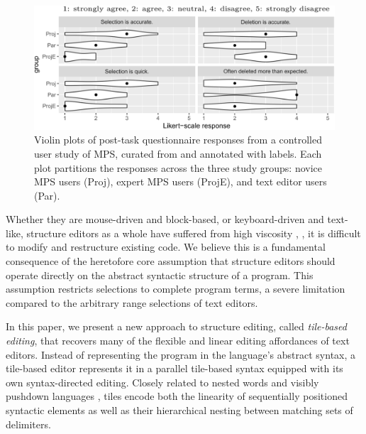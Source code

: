 \begin{figure}[b]
  \centering
  \includegraphics[width=\columnwidth]{img/mps-violin-plots.png}
  \caption{Violin plots of post-task questionnaire responses
  from a controlled user study of MPS, curated from \cite{ProjEfficiency}
  and annotated with labels.
  Each plot partitions the responses across the three study groups:
  novice MPS users (Proj), expert MPS users (ProjE),
  and text editor users (Par).
  }
  \label{fig:mps-violin-plots}
\end{figure}

Whether they are mouse-driven and block-based,
or keyboard-driven and text-like,
structure editors as a whole have suffered
from high viscosity \cite{cog-dim},
\ie, it is difficult to modify
and restructure existing code.
We believe this is a fundamental consequence
of the heretofore core assumption that structure editors
should operate directly on the abstract syntactic structure
of a program.
This assumption restricts selections to complete
program terms, a severe limitation compared to
the arbitrary range selections of text editors.

In this paper, we present a new approach to structure
editing, called \emph{tile-based editing}, that
recovers many of the flexible and linear editing
affordances of text editors.
Instead of representing the program in the language's
abstract syntax, a tile-based editor represents it
in a parallel tile-based syntax equipped with its own
syntax-directed editing.
Closely related to nested words \cite{nested-words}
and visibly pushdown languages \cite{visibly-pushdown-langs},
tiles encode both the linearity of sequentially
positioned syntactic elements as well as
their hierarchical nesting between matching sets
of delimiters.



